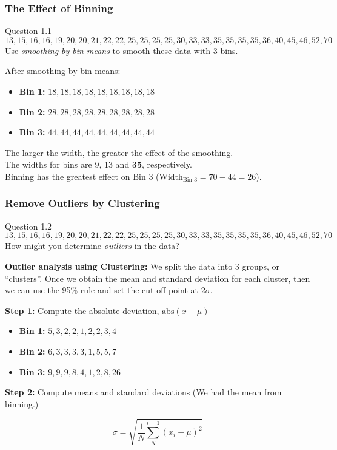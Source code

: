 \documentclass[aspectratio=169, 10pt]{beamer}
\begin{document}
\begin{frame}[t]
    \frametitle{The Effect of Binning}

    \begin{block}{Question 1.1}
        \[13,15,16,16,19,20,20,21,22,22,25,25,25,25,30,33,33,35,35,35,35,36,40,45,46,52,70\]
        Use \textit{smoothing by bin means} to smooth these data with 3 bins.
    \end{block}

    After smoothing by bin means:
    \begin{itemize}
        \item \textbf{Bin 1:} $18, 18, 18, 18, 18, 18, 18, 18, 18$
        \item \textbf{Bin 2:} $28, 28, 28, 28, 28, 28, 28, 28, 28$
        \item \textbf{Bin 3:} $44, 44, 44, 44, 44, 44, 44, 44, 44$
    \end{itemize}

    The larger the width, the greater the effect of the smoothing.\\
    The widths for bins are 9, 13 and \textbf{35}, respectively.\\
    Binning has the greatest effect on Bin 3 ($\text{Width}_{\text{Bin 3}}=70-44=26$).
\end{frame}

\begin{frame}[t]
    \frametitle{Remove Outliers by Clustering}

    \begin{block}{Question 1.2}
        \[13,15,16,16,19,20,20,21,22,22,25,25,25,25,30,33,33,35,35,35,35,36,40,45,46,52,70\]
        How might you determine \textit{outliers} in the data?
    \end{block}

    \textbf{Outlier analysis using Clustering:} We split the data into 3 groups, or ``clusters''.
    Once we obtain the mean and standard deviation for each cluster, 
    then we can use the 95\% rule and set the cut-off point at $2\sigma$.

    \textbf{Step 1:} Compute the absolute deviation, $\text{abs}(x - \mu)$

    \begin{itemize}
        \item \textbf{Bin 1:} $5, 3, 2, 2, 1, 2, 2, 3, 4$
        \item \textbf{Bin 2:} $6, 3, 3, 3, 3, 1, 5, 5, 7$
        \item \textbf{Bin 3:} $ 9,  9,  9,  8,  4,  1,  2,  8, 26$
    \end{itemize}

    \textbf{Step 2:} Compute means and standard deviations (We had the mean from binning.) 

    \[\sigma = \sqrt{\frac{1}{N}\sum_{N}^{i=1}(x_i-\mu)^2}\]

\end{frame}
\end{document}
